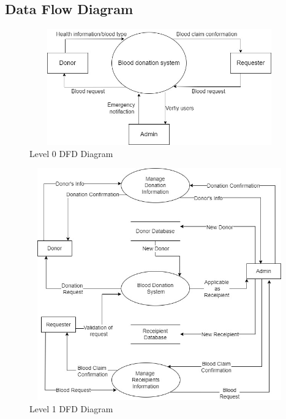 \subsection{Data Flow Diagram}
\begin{figure}[h]
    \centering
    \includegraphics[width=140mm, height= 50mm]{images/DFD0.jpg}
    \vspace{2mm}
    \caption{Level 0 DFD Diagram}
    \label{fig:level 0 DFD}
\end{figure}
\vspace{0.5in}
\begin{figure}[h]
    \centering
    \includegraphics[width=140mm, height = 100mm]{images/dfd1.jpg}
    \caption{Level 1 DFD Diagram}
    \label{fig:level 1 DFD}
\end{figure}

\newpage
